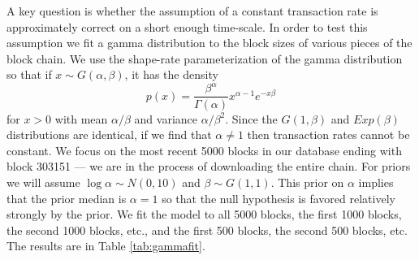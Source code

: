 \documentclass{article}
\begin{document}
A key question is whether the assumption of a constant transaction rate is approximately correct on a short enough time-scale. In order to test this assumption we fit a gamma distribution to the block sizes of various pieces of the block chain. We use the shape-rate parameterization of the gamma distribution so that if $x\sim G(\alpha,\beta)$, it has the density
\[
p(x) = \frac{\beta^\alpha}{\Gamma(\alpha)}x^{\alpha-1}e^{-x\beta}
\]
for $x>0$ with mean $\alpha/\beta$ and variance $\alpha/\beta^2$. Since the $G(1,\beta)$ and $Exp(\beta)$ distributions are identical, if we find that $\alpha\neq 1$ then transaction rates cannot be constant. We focus on the most recent 5000 blocks in our database ending with block 303151 --- we are in the process of downloading the entire chain.  For priors we will assume $\log \alpha \sim N(0, 10)$ and $\beta \sim G(1, 1)$. This prior on $\alpha$ implies that the prior median is $\alpha=1$ so that the null hypothesis is favored relatively strongly by the prior. We fit the model to all 5000 blocks, the first 1000 blocks, the second 1000 blocks, etc., and the first 500 blocks, the second 500 blocks, etc. The results are in Table \ref{tab:gammafit}. 
\end{document}
